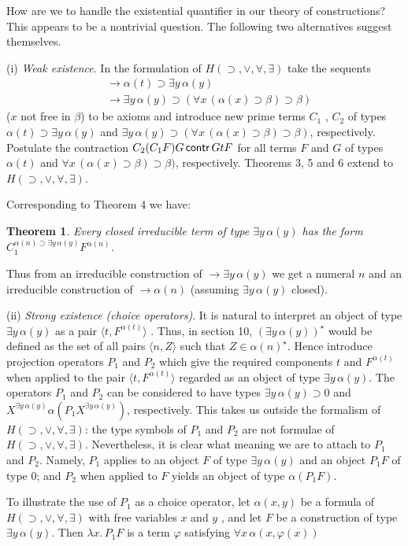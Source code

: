 \documentclass[12pt]{article}
\def\imp{\rightarrow}
\def\l{\lambda}
\def\limp{\supset}
\def\a{\alpha}
\def\b{\beta}
\def\ey{\exists y \, \a(y)}
\def\HIMPE{H(\limp, \lor, \forall, \exists)}
\newtheorem{theorem}{Theorem}
\begin{document}
How are we to handle the existential quantifier in our theory of constructions? This appears to be a nontrivial question. The following two alternatives suggest themselves.

\bigskip
\noindent
(i) {\it Weak existence}. In the formulation of $\HIMPE$ take the sequents
\begin{align*}
&\imp \a (t) \limp \exists y\, \a(y) \\
&\imp \exists y\, \a(y) \limp ( \forall x \, (\a(x) \limp \b) \limp \b)
\end{align*}
%
($x$ not free in $\b$) to be axioms and introduce new prime terms $C_1$ , $C_2$ of types $\a(t) \limp \exists y \, \a(y)$ and  $\exists y\, \a(y) \limp ( \forall x \, (\a(x) \limp \b) \limp \b)$, respectively. Postulate the contraction $C_2 ( C_1 F ) G \mathop{\sf contr} G t F$
for all terms $F$ and $G$ of types $\a( t )$ and $\forall x \, (\a(x) \limp \b) \limp \b)$, respectively. Theorems 3, 5 and 6 extend to $\HIMPE$.

Corresponding to Theorem 4 we have:

\begin{theorem}
Every closed irreducible term of type $\exists y \, \a(y)$ has the form $C_1^{ \a(n) \limp \exists y \, \a(y)} F ^{\a (n)}$.
\end{theorem}
%
Thus from an irreducible construction of $\imp  \exists y \, \a(y)$ we get a numeral $n$ and an irreducible construction of $\imp \a( n )$ (assuming $\exists y \, \a(y)$ closed).

\bigskip
\noindent
(ii) {\it Strong existence (choice operators)}. It is natural to interpret an object of type $\ey$ as a pair $\langle t, F^{\a(t)}\rangle$ . Thus, in section 10, $(\ey)^\star$ would be defined as the set of all pairs $\langle n, Z\rangle$ such that $Z \in \a(n)^\star$. Hence introduce projection operators $P_1$ and $P_2$ which give the required components $t$ and $F^{\a(t)}$ when applied to the pair $\langle t, F^{\a(t)}\rangle$ regarded as an object of type $\ey$. The operators $P_1$ and $P_2$ can be considered to have types $\ey \limp 0$ and $X^{\ey}\a(P_1 X^{\ey})$, respectively. This takes us outside the formalism of $\HIMPE$: the type symbols of $P_1$ and $P_2$ are not formulae of $\HIMPE$. Nevertheless, it is clear what meaning we are to attach to $P_1$ and $P_2$. Namely, $P_1$ applies to an object $F$ of type $\ey$ and an object $P_1 F$ of type $0$; and $P_2$ when applied to $F$ yields an object of type $\a ( P_1 F )$.

To illustrate the use of $P_1$ as a choice operator, let $\a(x,y)$ be a formula of $\HIMPE$ with free variables $x$ and $y$ , and let $F$
 be a construction of type $\ey$. Then $\l x . \, P_1 F$ is a term $\varphi$ satisfying $\forall x \, \a (x, \varphi(x))$
\end{document}
